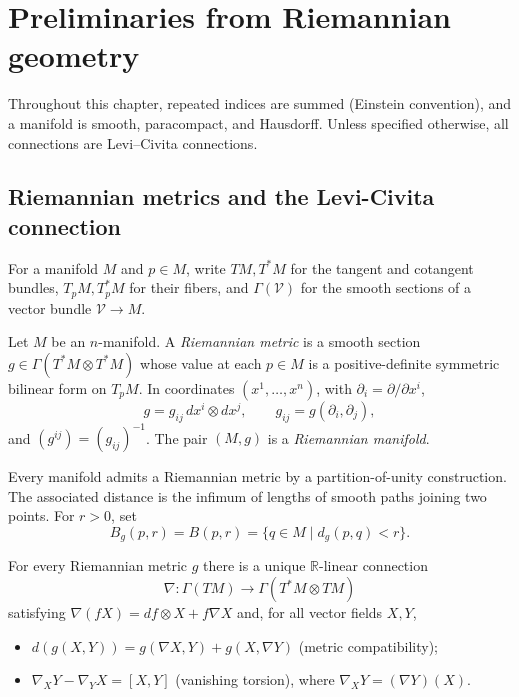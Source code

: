 \chapter{Preliminaries from Riemannian geometry}
\label{chap:prelim}
\label{sectprelim}

Throughout this chapter, repeated indices are summed (Einstein
convention), and a manifold is smooth, paracompact, and Hausdorff. Unless
specified otherwise, all connections are Levi--Civita connections.


\section{Riemannian metrics and the Levi-Civita connection}

For a manifold $M$ and $p\in M$, write $TM,T^*M$ for the tangent and
cotangent bundles, $T_pM,T_p^*M$ for their fibers, and
$\Gamma(\mathcal V)$ for the smooth sections of a vector bundle
$\mathcal V\to M$.

\begin{definition}
\label{def:riemannian-metric}
\leanok


Let $M$ be an $n$-manifold. A \emph{Riemannian metric} is a smooth
section $g\in\Gamma(T^*M\otimes T^*M)$ whose value at each $p\in M$ is
a positive-definite symmetric bilinear form on $T_pM$. In coordinates
$(x^1,\ldots,x^n)$, with $\partial_i=\partial/\partial x^i$,
\[
  g=g_{ij}\,dx^i\otimes dx^j,
  \qquad g_{ij}=g(\partial_i,\partial_j),
\]
and $(g^{ij})=(g_{ij})^{-1}$. The pair $(M,g)$ is a \emph{Riemannian
manifold}.
\end{definition}

Every manifold admits a Riemannian metric by a partition-of-unity
construction. The associated distance is the infimum of lengths of smooth
paths joining two points. For $r>0$, set
\[
  B_g(p,r)=B(p,r)=\{q\in M\mid d_g(p,q)<r\}.
\]

\begin{theorem}
\label{thm:levi-civita-connection}
\leanok



For every Riemannian metric $g$ there is a unique $\mathbb R$-linear
connection
\[
  \nabla:\Gamma(TM)\longrightarrow\Gamma(T^*M\otimes TM)
\]
satisfying $\nabla(fX)=df\otimes X+f\nabla X$ and, for all vector
fields $X,Y$,
\begin{itemize}
\item[$\bullet$] $d(g(X,Y))=g(\nabla X,Y)+g(X,\nabla Y)$
  (metric compatibility);
\item[$\bullet$] $\nabla_XY-\nabla_YX=[X,Y]$ (vanishing torsion),
  where $\nabla_XY=(\nabla Y)(X)$.
\end{itemize}
\end{theorem}

